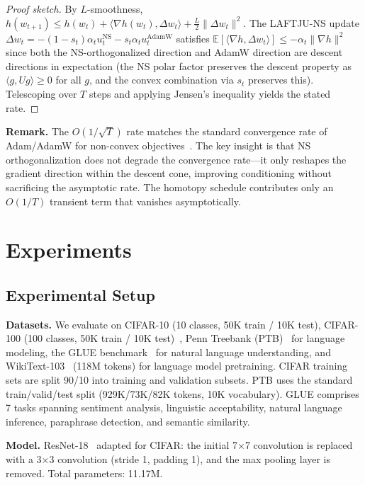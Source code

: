 \documentclass[10pt,twocolumn]{article}
\newcommand{\method}{LAFTJU}
\newcommand{\E}{\mathbb{E}}
\begin{document}
\begin{proof}[Proof sketch]
By $L$-smoothness, $h(w_{t+1}) \leq h(w_t) + \langle \nabla h(w_t), \Delta w_t \rangle + \frac{L}{2}\|\Delta w_t\|^2$. The \method{}-NS update $\Delta w_t = -(1-s_t)\alpha_t u_t^{\mathrm{NS}} - s_t \alpha_t u_t^{\mathrm{AdamW}}$ satisfies $\E[\langle \nabla h, \Delta w_t \rangle] \leq -\alpha_t \|\nabla h\|^2$ since both the NS-orthogonalized direction and AdamW direction are descent directions in expectation (the NS polar factor preserves the descent property as $\langle g, Ug \rangle \geq 0$ for all $g$, and the convex combination via $s_t$ preserves this). Telescoping over $T$ steps and applying Jensen's inequality yields the stated rate.
\end{proof}

\textbf{Remark.} The $O(1/\sqrt{T})$ rate matches the standard convergence rate of Adam/AdamW for non-convex objectives~\cite{adam}. The key insight is that NS orthogonalization does not degrade the convergence rate---it only reshapes the gradient direction within the descent cone, improving conditioning without sacrificing the asymptotic rate. The homotopy schedule contributes only an $O(1/T)$ transient term that vanishes asymptotically.

\section{Experiments}

\subsection{Experimental Setup}

\textbf{Datasets.} We evaluate on CIFAR-10 (10 classes, 50K train / 10K test), CIFAR-100 (100 classes, 50K train / 10K test)~\cite{cifar}, Penn Treebank (PTB)~\cite{ptb} for language modeling, the GLUE benchmark~\cite{glue} for natural language understanding, and WikiText-103~\cite{wikitext} (118M tokens) for language model pretraining. CIFAR training sets are split 90/10 into training and validation subsets. PTB uses the standard train/valid/test split (929K/73K/82K tokens, 10K vocabulary). GLUE comprises 7 tasks spanning sentiment analysis, linguistic acceptability, natural language inference, paraphrase detection, and semantic similarity.

\textbf{Model.} ResNet-18~\cite{resnet} adapted for CIFAR: the initial 7$\times$7 convolution is replaced with a 3$\times$3 convolution (stride 1, padding 1), and the max pooling layer is removed. Total parameters: 11.17M.
\end{document}
